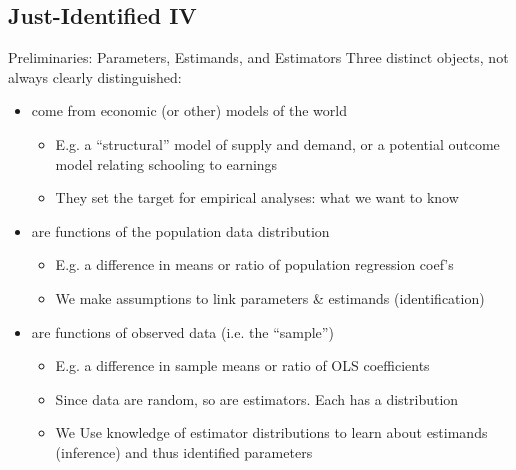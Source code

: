 \documentclass{beamer}
\begin{document}
\subsection{Just-Identified IV}

\begin{frame}{Preliminaries: Parameters, Estimands, and Estimators}
\vspace{-0.2cm}
Three distinct objects, not always clearly distinguished: \pause
{\small
\begin{itemize}
  \item {} come from economic (or other) models of the world
  \begin{itemize}\itemsep0em
    \item E.g. a ``structural'' model of supply and demand, or a potential outcome model relating schooling to earnings
    \item They set the target for empirical analyses: what we want to know
  \end{itemize}\pause
  
  \item {} are functions of the population data distribution 
  \begin{itemize}\itemsep0em
    \item E.g. a difference in means or ratio of population regression coef's
    \item We make assumptions to link parameters \& estimands (identification)
  \end{itemize}\pause
  
  \item {} are functions of observed data (i.e. the ``sample'')
  \begin{itemize}\itemsep0em
    \item E.g. a difference in sample means or ratio of OLS coefficients 
    \item Since data are random, so are estimators. Each has a distribution
    \item We Use knowledge of estimator distributions to learn about estimands (inference) and thus identified parameters
  \end{itemize}
\end{itemize}
}
\end{frame}
\end{document}

